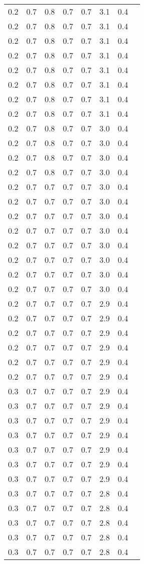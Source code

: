 \begin{tabular}{L{1in}|L{1in}|L{1in}|L{1in}|L{1in}|L{1in}|L{1in}|L{1in}}
0.2&0.7&0.8&0.7&0.7&3.1&0.4\\
0.2&0.7&0.8&0.7&0.7&3.1&0.4\\
0.2&0.7&0.8&0.7&0.7&3.1&0.4\\
0.2&0.7&0.8&0.7&0.7&3.1&0.4\\
0.2&0.7&0.8&0.7&0.7&3.1&0.4\\
0.2&0.7&0.8&0.7&0.7&3.1&0.4\\
0.2&0.7&0.8&0.7&0.7&3.1&0.4\\
0.2&0.7&0.8&0.7&0.7&3.1&0.4\\
0.2&0.7&0.8&0.7&0.7&3.0&0.4\\
0.2&0.7&0.8&0.7&0.7&3.0&0.4\\
0.2&0.7&0.8&0.7&0.7&3.0&0.4\\
0.2&0.7&0.8&0.7&0.7&3.0&0.4\\
0.2&0.7&0.7&0.7&0.7&3.0&0.4\\
0.2&0.7&0.7&0.7&0.7&3.0&0.4\\
0.2&0.7&0.7&0.7&0.7&3.0&0.4\\
0.2&0.7&0.7&0.7&0.7&3.0&0.4\\
0.2&0.7&0.7&0.7&0.7&3.0&0.4\\
0.2&0.7&0.7&0.7&0.7&3.0&0.4\\
0.2&0.7&0.7&0.7&0.7&3.0&0.4\\
0.2&0.7&0.7&0.7&0.7&3.0&0.4\\
0.2&0.7&0.7&0.7&0.7&2.9&0.4\\
0.2&0.7&0.7&0.7&0.7&2.9&0.4\\
0.2&0.7&0.7&0.7&0.7&2.9&0.4\\
0.2&0.7&0.7&0.7&0.7&2.9&0.4\\
0.2&0.7&0.7&0.7&0.7&2.9&0.4\\
0.2&0.7&0.7&0.7&0.7&2.9&0.4\\
0.3&0.7&0.7&0.7&0.7&2.9&0.4\\
0.3&0.7&0.7&0.7&0.7&2.9&0.4\\
0.3&0.7&0.7&0.7&0.7&2.9&0.4\\
0.3&0.7&0.7&0.7&0.7&2.9&0.4\\
0.3&0.7&0.7&0.7&0.7&2.9&0.4\\
0.3&0.7&0.7&0.7&0.7&2.9&0.4\\
0.3&0.7&0.7&0.7&0.7&2.9&0.4\\
0.3&0.7&0.7&0.7&0.7&2.8&0.4\\
0.3&0.7&0.7&0.7&0.7&2.8&0.4\\
0.3&0.7&0.7&0.7&0.7&2.8&0.4\\
0.3&0.7&0.7&0.7&0.7&2.8&0.4\\
0.3&0.7&0.7&0.7&0.7&2.8&0.4\\

\end{tabular}
